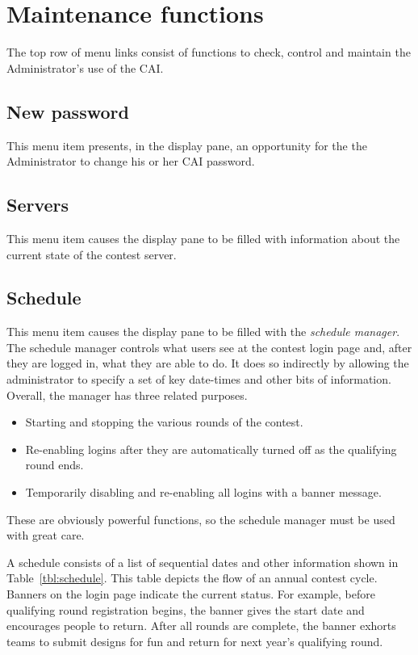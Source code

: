 \documentclass[11pt,letterpaper]{refart}
\begin{document}
\section{Maintenance functions}
The top row of menu links consist of functions to check, control and maintain the 
Administrator's use of the CAI.

\subsection{New password}
This menu item presents, in the display pane, an opportunity for the
the Administrator to change his or her CAI password.

\subsection{Servers}
This menu item causes the display pane to be filled with information about the
current state of the contest server. 

\subsection{Schedule}
This menu item causes the display pane to be filled with the \emph{schedule
manager}. The schedule manager controls what users see at the contest
login page and, after they are logged in, what they are able to do. 
It does so indirectly by allowing the administrator to specify a set of key 
date-times and other bits of information.
Overall, the manager has three related purposes.
\begin{itemize}
\item Starting and stopping the various rounds of the contest.
\item Re-enabling logins after they are automatically turned off
as the qualifying round ends.
\item Temporarily disabling and re-enabling all logins with a banner 
message.
\end{itemize}
These are obviously powerful functions, so the schedule manager must
be used with great care.

A schedule consists of a list of sequential dates and other information
shown in Table~\ref{tbl:schedule}. This table depicts the flow of an
annual contest cycle. Banners on the login page indicate the current
status. For example, before qualifying round registration begins, the
banner gives the start date and encourages people to return. After
all rounds are complete, the banner exhorts teams to submit designs
for fun and return for next year's qualifying round.
\end{document}
